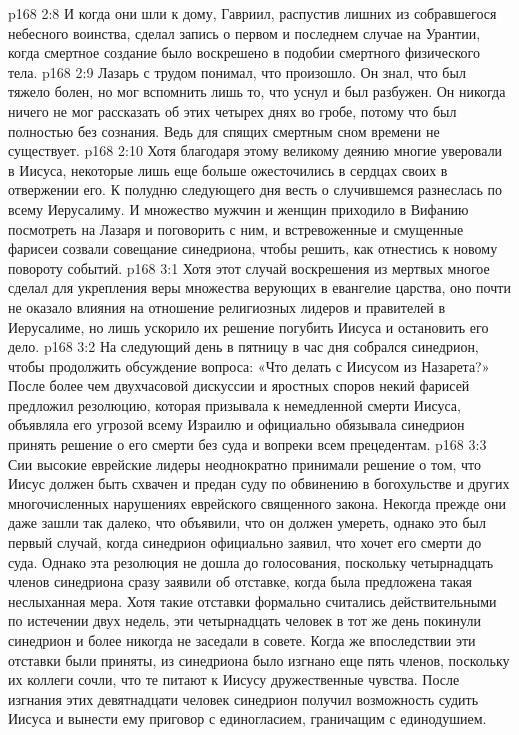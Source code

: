 \vs p168 2:8 \pc И когда они шли к дому, Гавриил, распустив лишних из собравшегося небесного воинства, сделал запись о первом и последнем случае на Урантии, когда смертное создание было воскрешено в подобии смертного физического тела.
\vs p168 2:9 \pc Лазарь с трудом понимал, что произошло. Он знал, что был тяжело болен, но мог вспомнить лишь то, что уснул и был разбужен. Он никогда ничего не мог рассказать об этих четырех днях во гробе, потому что был полностью без сознания. Ведь для спящих смертным сном времени не существует.
\vs p168 2:10 Хотя благодаря этому великому деянию многие уверовали в Иисуса, некоторые лишь еще больше ожесточились в сердцах своих в отвержении его. К полудню следующего дня весть о случившемся разнеслась по всему Иерусалиму. И множество мужчин и женщин приходило в Вифанию посмотреть на Лазаря и поговорить с ним, и встревоженные и смущенные фарисеи созвали совещание синедриона, чтобы решить, как отнестись к новому повороту событий.
\vs p168 3:1 Хотя этот случай воскрешения из мертвых многое сделал для укрепления веры множества верующих в евангелие царства, оно почти не оказало влияния на отношение религиозных лидеров и правителей в Иерусалиме, но лишь ускорило их решение погубить Иисуса и остановить его дело.
\vs p168 3:2 \pc На следующий день в пятницу в час дня собрался синедрион, чтобы продолжить обсуждение вопроса: «Что делать с Иисусом из Назарета?» После более чем двухчасовой дискуссии и яростных споров некий фарисей предложил резолюцию, которая призывала к немедленной смерти Иисуса, объявляла его угрозой всему Израилю и официально обязывала синедрион принять решение о его смерти без суда и вопреки всем прецедентам.
\vs p168 3:3 Сии высокие еврейские лидеры неоднократно принимали решение о том, что Иисус должен быть схвачен и предан суду по обвинению в богохульстве и других многочисленных нарушениях еврейского священного закона. Некогда прежде они даже зашли так далеко, что объявили, что он должен умереть, однако это был первый случай, когда синедрион официально заявил, что хочет его смерти до суда. Однако эта резолюция не дошла до голосования, поскольку четырнадцать членов синедриона сразу заявили об отставке, когда была предложена такая неслыханная мера. Хотя такие отставки формально считались действительными по истечении двух недель, эти четырнадцать человек в тот же день покинули синедрион и более никогда не заседали в совете. Когда же впоследствии эти отставки были приняты, из синедриона было изгнано еще пять членов, поскольку их коллеги сочли, что те питают к Иисусу дружественные чувства. После изгнания этих девятнадцати человек синедрион получил возможность судить Иисуса и вынести ему приговор с единогласием, граничащим с единодушием.
